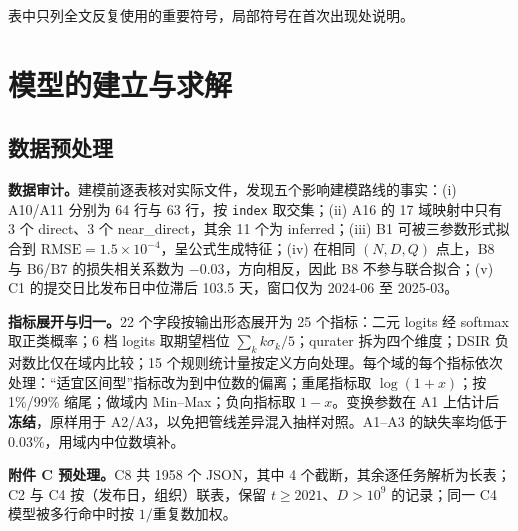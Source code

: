 表中只列全文反复使用的重要符号，局部符号在首次出现处说明。

\section{模型的建立与求解}

\subsection{数据预处理}

\textbf{数据审计。}建模前逐表核对实际文件，发现五个影响建模路线的事实：(i) A10/A11 分别为 64 行与 63 行，按 \texttt{index} 取交集；(ii) A16 的 17 域映射中只有 3 个 direct、3 个 near\_direct，其余 11 个为 inferred；(iii) B1 可被三参数形式拟合到 $\mathrm{RMSE}=1.5\times10^{-4}$，呈公式生成特征；(iv) 在相同 $(N,D,Q)$ 点上，B8 与 B6/B7 的损失相关系数为 $-0.03$，方向相反，因此 B8 不参与联合拟合；(v) C1 的提交日比发布日中位滞后 103.5 天，窗口仅为 2024-06 至 2025-03。

\textbf{指标展开与归一。}22 个字段按输出形态展开为 25 个指标：二元 logits 经 softmax 取正类概率；6 档 logits 取期望档位 $\sum_k k\sigma_k/5$；qurater 拆为四个维度；DSIR 负对数比仅在域内比较；15 个规则统计量按定义方向处理。每个域的每个指标依次处理：“适宜区间型”指标改为到中位数的偏离；重尾指标取 $\log(1+x)$；按 1\%/99\% 缩尾；做域内 Min–Max；负向指标取 $1-x$。变换参数在 A1 上估计后\textbf{冻结}，原样用于 A2/A3，以免把管线差异混入抽样对照。A1–A3 的缺失率均低于 $0.03\%$，用域内中位数填补。

\textbf{附件 C 预处理。}C8 共 1958 个 JSON，其中 4 个截断，其余逐任务解析为长表；C2 与 C4 按（发布日，组织）联表，保留 $t\ge2021$、$D>10^9$ 的记录；同一 C4 模型被多行命中时按 $1/$重复数加权。
